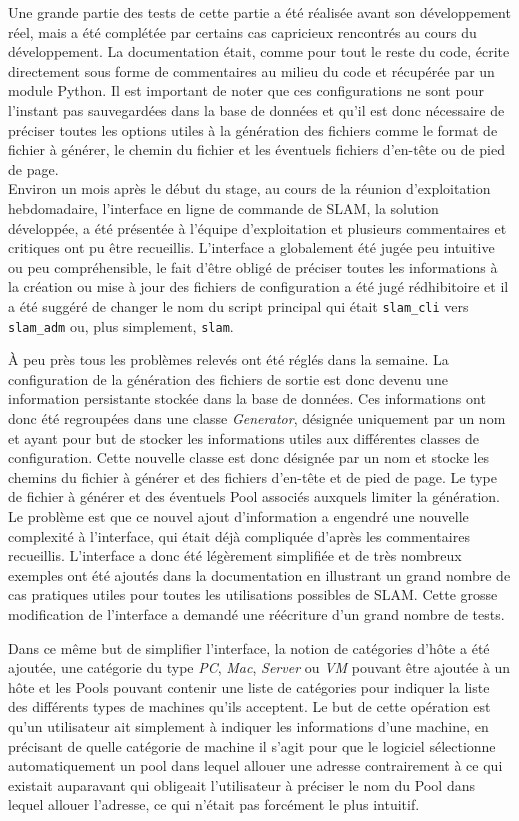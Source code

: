 \documentclass[12pt,a4paper,twoside]{report}
\begin{document}
Une grande partie des tests de cette partie a été réalisée avant son
développement réel, mais a été complétée par certains cas capricieux rencontrés
au cours du développement. La documentation était, comme pour tout le reste du
code, écrite directement sous forme de commentaires au milieu du code et
récupérée par un module Python. Il est important de noter que ces
configurations ne sont pour l’instant pas sauvegardées dans la base de données
et qu’il est donc nécessaire de préciser toutes les options utiles à la
génération des fichiers comme le format de fichier à générer, le chemin du
fichier et les éventuels fichiers d’en-tête ou de pied de page.\\

Environ un mois après le début du stage, au cours de la réunion d’exploitation
hebdomadaire, l’interface en ligne de commande de SLAM, la solution développée,
a été présentée à l’équipe d’exploitation et plusieurs commentaires et
critiques ont pu être recueillis. L’interface a globalement été jugée peu
intuitive ou peu compréhensible, le fait d’être obligé de préciser toutes les
informations à la création ou mise à jour des fichiers de configuration a été
jugé rédhibitoire et il a été suggéré de changer le nom du script principal qui
était \verb+slam_cli+ vers \verb+slam_adm+ ou, plus simplement, \verb+slam+.

À peu près tous les problèmes relevés ont été réglés dans la semaine. La
configuration de la génération des fichiers de sortie est donc devenu une
information persistante stockée dans la base de données. Ces informations ont
donc été regroupées dans une classe \emph{Generator}, désignée uniquement par
un nom et ayant pour but de stocker les informations utiles aux différentes
classes de configuration. Cette nouvelle classe est donc désignée par un nom et
stocke les chemins du fichier à générer et des fichiers d’en-tête et de pied de
page. Le type de fichier à générer et des éventuels Pool associés auxquels
limiter la génération. Le problème est que ce nouvel ajout d’information a
engendré une nouvelle complexité à l’interface, qui était déjà compliquée
d’après les commentaires recueillis. L’interface a donc été légèrement
simplifiée et de très nombreux exemples ont été ajoutés dans la documentation
en illustrant un grand nombre de cas pratiques utiles pour toutes les
utilisations possibles de SLAM. Cette grosse modification de l’interface a
demandé une réécriture d’un grand nombre de tests.

Dans ce même but de simplifier l’interface, la notion de catégories d’hôte a
été ajoutée, une catégorie du type \emph{PC}, \emph{Mac}, \emph{Server} ou
\emph{VM} pouvant être ajoutée à un hôte et les Pools pouvant contenir une
liste de catégories pour indiquer la liste des différents types de machines
qu’ils acceptent. Le but de cette opération est qu’un utilisateur ait
simplement à indiquer les informations d’une machine, en précisant de quelle
catégorie de machine il s’agit pour que le logiciel sélectionne automatiquement
un pool dans lequel allouer une adresse contrairement à ce qui existait
auparavant qui obligeait l’utilisateur à préciser le nom du Pool dans lequel
allouer l’adresse, ce qui n’était pas forcément le plus intuitif.\\
\end{document}
